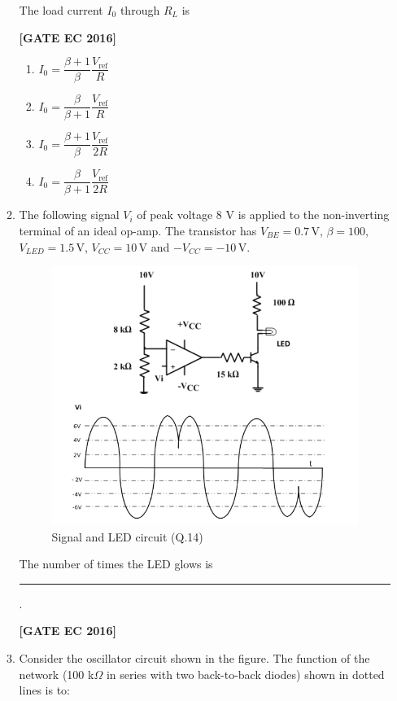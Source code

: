 \documentclass[12pt]{article}
\begin{document}
\begin{enumerate}[label=\textbf{Q.\arabic*.}, start=6, itemsep=2em]
\begin{enumerate}[label=\textbf{Q.\arabic*.}]
The load current $I_0$ through $R_L$ is

\noindent \textbf{[GATE EC 2016]}

\begin{multicols}{2}
\begin{enumerate}[label=\alph*.]
    \item \(I_0 = \dfrac{\beta+1}{\beta}\dfrac{V_{\text{ref}}}{R}\)
    \item \(I_0 = \dfrac{\beta}{\beta+1}\dfrac{V_{\text{ref}}}{R}\)
    \item \(I_0 = \dfrac{\beta+1}{\beta}\dfrac{V_{\text{ref}}}{2R}\)
    \item \(I_0 = \dfrac{\beta}{\beta+1}\dfrac{V_{\text{ref}}}{2R}\)
\end{enumerate}
\end{multicols}

\item The following signal $V_i$ of peak voltage 8 V is applied to the non-inverting terminal of an ideal op-amp. The transistor has $V_{BE}=0.7\,$V, $\beta=100$, $V_{LED}=1.5\,$V, $V_{CC}=10\,$V and $-V_{CC}=-10\,$V.

\begin{figure}[H]\centering
    \includegraphics[width=0.65\columnwidth]{figs/q14.png}
    \caption{Signal and LED circuit (Q.14)}
    \label{fig:q14}
\end{figure}

The number of times the LED glows is \rule{2.5cm}{0.4pt}.

\noindent \textbf{[GATE EC 2016]}

\item Consider the oscillator circuit shown in the figure. The function of the network (100 k$\Omega$ in series with two back-to-back diodes) shown in dotted lines is to:


\end{enumerate}
\end{enumerate}
\end{document}
